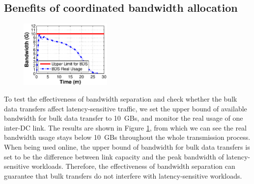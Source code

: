 
\subsection{Benefits of coordinated bandwidth allocation}
\label{subsec:evaluation:separation}
\begin{figure}[t]
  \centering
  \includegraphics[width=45mm]{images/Quota.eps}
  \label{fig:quota}
\vspace{-0.4cm}
\end{figure}

To test the effectiveness of bandwidth separation and check whether the bulk data transfers affect latency-sensitive traffic, we set the upper bound of available bandwidth for bulk data transfer to 10~GBs, and monitor the real usage of one inter-DC link. The results are shown in Figure \ref{fig:quota}, from which we can see the real bandwidth usage stays below 10~GBs throughout the whole transmission process.
When being used online, the upper bound of bandwidth for bulk data transfers is set to be the difference between link capacity and the peak bandwidth of latency-sensitive workloads. Therefore, the effectiveness of \name bandwidth separation can guarantee that bulk transfers do not interfere with latency-sensitive workloads.%

